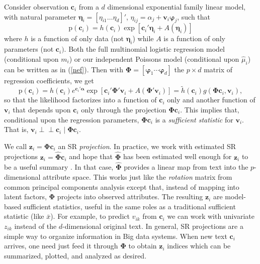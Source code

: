 \documentclass[12pt]{article}
\newcommand{\bs}[1]{\boldsymbol{#1}}
\newcommand{\mr}[1]{\mathrm{#1}}
\newcommand{\bm}[1]{\mathbf{#1}}
\newcommand{\indep}{\perp\!\!\!\perp}
\begin{document}
Consider observation $\bm{c}_i$ from a $d$ dimensional exponential family
linear model, with natural parameter $\bs{\eta}_i = [\eta_{i1} \ldots
\eta_d]'$,  $\eta_{ij} = \alpha_j + \bm{v}_i\bs{\varphi}_j$, such that
\begin{equation}\label{nef}
\mr{p}(\bm{c}_i) = h(\bm{c}_i)\exp\left[\bm{c}_i'\bs{\eta}_i + A(\bs{\eta}_i)\right]
\end{equation}
where $h$ is a function of only data (not $\bs{\eta}_i$) while $A$ is a
function of only parameters (not $\bm{c}_i)$.  Both the full
multinomial logistic regression model (conditional upon $m_i$) or our
independent Poissons model (conditional upon $\hat\mu_i$) can be written as in
(\ref{nef}). Then with $\bs{\Phi} = [\bs{\varphi}_1 \cdots
\bs{\varphi}_d]$ the $p\times d$ matrix of regression coefficients, we get
\begin{equation}\label{srproof}
\mr{p}(\bm{c}_i) = h(\bm{c}_i)e^{\bm{c}_i'\bs{\alpha}}
\exp\left[\bm{c}_i'\bs{\Phi}'\bm{v}_i + A(\bs{\Phi}'\bm{v}_i)\right] = 
\tilde h(\bm{c}_i)g(\bs{\Phi}\bm{c}_i,\bm{v}_i),
\end{equation}
so that the likelihood factorizes into a function of $\bm{c}_i$ only and
another function of $\bm{v}_i$ that depends upon $\bm{c}_i$ only through the
projection $\bs{\Phi}\bm{c}_i$.  This implies that, conditional upon
the regression parameters,  $\bs{\Phi}\bm{c}_i$ is a {\it
sufficient statistic} for $\bm{v}_i$.  That is, $\bm{v}_i \indep \bm{c}_i \mid
\bs{\Phi}\bm{c}_i$.

We call $\bm{z}_i = \bs{\Phi}\bm{c}_i$ an SR {\it projection}. In practice, we
work with estimated SR projections $\bm{z}_i =  \bs{\hat\Phi}\bm{c}_i$ and
hope that $\bs{\hat\Phi}$ has been estimated well enough for $\bm{z}_i$ to be
a useful summary \citep[see][for discussion]{taddy_rejoinder:_2013}. In that
case, $\bm{\hat\Phi}$ provides a linear map from text into the $p$-dimensional
attribute space.  This works just like the {\it rotation} matrix from common
principal components analysis except that, instead of mapping into latent
factors,  $\bs{\Phi}$ projects into observed attributes. The resulting
$\bm{z}_i$ are model-based sufficient statistics, useful in the same roles
as a traditional sufficient statistic (like $\bar x$). For example, to predict
$v_{ik}$ from $\bm{c}_i$ we can work with  univariate $z_{ik}$ instead of the
$d$-dimensional original text. In general, SR projections are a simple way to
organize information in Big data systems.  When new text $\bm{c}_i$ arrives,
one need just feed it through $\bs{\Phi}$ to obtain $\bm{z}_i$ indices which
can be summarized, plotted, and analyzed as desired.
\end{document}
